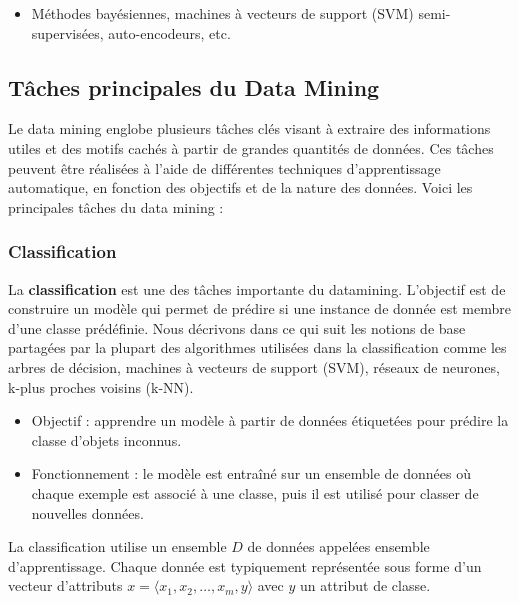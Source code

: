 \documentclass[a4paper,14pt]{article}
\begin{document}
        
        \begin{itemize}
            \item Méthodes bayésiennes, machines à vecteurs de support (SVM) semi-supervisées, auto-encodeurs, etc.
        \end{itemize}
    
      \subsection{Tâches principales du Data Mining}
        Le data mining englobe plusieurs tâches clés visant à extraire des informations utiles et des motifs cachés à partir de grandes quantités de données. Ces tâches peuvent être réalisées à l'aide de différentes techniques d'apprentissage automatique, en fonction des objectifs et de la nature des données. Voici les principales tâches du data mining :
        
        \subsubsection{Classification}
        
        La \textbf{classification} est une des tâches importante du datamining. L’objectif est de construire un modèle qui permet de prédire si une instance de donnée est membre d’une classe prédéfinie.  Nous décrivons dans ce qui suit les notions de base partagées par la plupart des algorithmes utilisées dans la classification comme les arbres de décision, machines à vecteurs de support (SVM), réseaux de neurones, k-plus proches voisins (k-NN).



            \begin{itemize}
                \item  Objectif : apprendre un modèle à partir de données étiquetées pour prédire la classe d’objets inconnus.
                \item  Fonctionnement : le modèle est entraîné sur un ensemble de données où chaque exemple est associé à une classe, puis il est utilisé pour classer de nouvelles données.\\
            \end{itemize}
            La classification utilise un ensemble $D$ de données appelées ensemble d’apprentissage. Chaque donnée est typiquement représentée sous forme d’un vecteur d’attributs 
            $x = \langle x_1, x_2, \dots, x_m, y \rangle$ avec $y$ un attribut de classe. 
            
\end{document}
